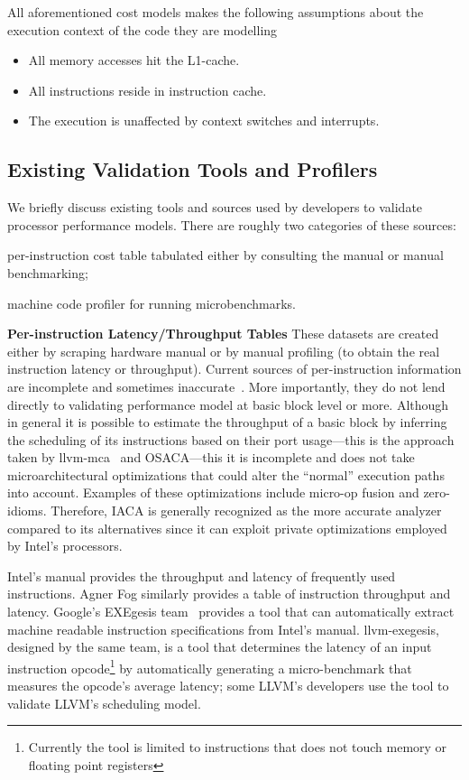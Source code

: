 \vspace{1em}
All aforementioned cost models makes the following assumptions about the execution context
of the code they are modelling
\begin{itemize}
    \item All memory accesses hit the L1-cache.
    \item All instructions reside in instruction cache.
    \item The execution is unaffected by context switches and interrupts.
\end{itemize}

\subsection{Existing Validation Tools and Profilers}
We briefly discuss existing tools and sources used by developers to validate
processor performance  models.
There are roughly two categories of these sources:
\begin{enumerate*}
\item per-instruction cost table tabulated either by
consulting the manual or manual benchmarking;
\item machine code profiler for running microbenchmarks.
\end{enumerate*}

\textbf{Per-instruction Latency/Throughput Tables}
These datasets are created either by scraping hardware manual or
by manual profiling 
(to obtain the real instruction latency or throughput).
Current sources of per-instruction information are incomplete and sometimes inaccurate~\cite{uops}. 
More importantly, they do not lend directly to validating performance model at basic block level or more.
Although in general it is possible to estimate the throughput of 
a basic block by inferring the scheduling of its instructions based on their
port usage---this is the approach taken by llvm-mca~\cite{llvm-mca} and OSACA\cite{osaca}---this
it is incomplete and does not take microarchitectural
optimizations that could alter the ``normal'' execution paths into account. 
Examples of these optimizations include micro-op fusion and zero-idioms.
Therefore, IACA\cite{iaca} is generally recognized as the more accurate analyzer
compared to its alternatives since it can exploit
private optimizations employed by Intel's processors.

Intel's manual\cite{intel-manual} provides the throughput and latency
of frequently used instructions.
Agner Fog\cite{agner} similarly provides a table of instruction throughput and latency.
Google's EXEgesis team~\cite{exegesis} provides a tool that can automatically extract
machine readable instruction specifications from Intel's manual.
llvm-exegesis, designed by the same team, is a tool that determines
the latency of an input instruction opcode\footnote{
Currently the tool is limited to instructions that does not touch memory or floating point registers} 
by automatically generating a micro-benchmark that measures the opcode's average latency;
some LLVM's developers use the tool to validate LLVM's scheduling model.

